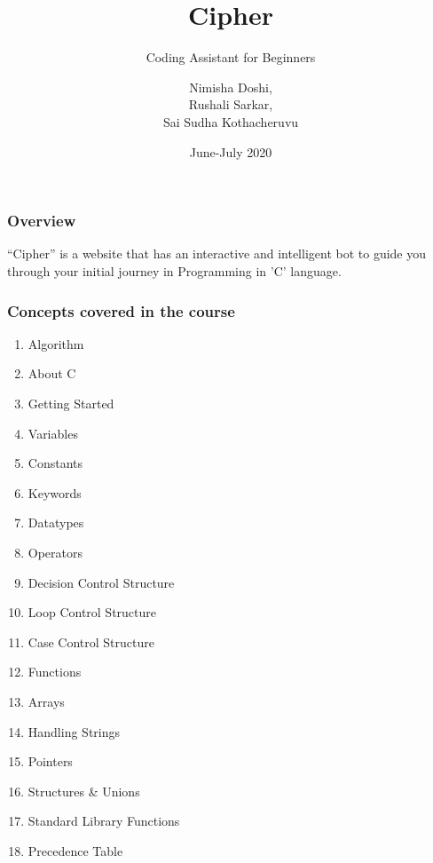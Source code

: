 \documentclass[14pt]{beamer}
\title[Cipher]{Cipher}
\subtitle[Coding Assitant]{Coding Assistant for Beginners}
\author[Team 2]{Nimisha Doshi, \\ Rushali Sarkar, \\ Sai Sudha Kothacheruvu}
\date[June 2020]{June-July 2020}
\begin{document}
\begin{frame}
    \titlepage
\end{frame}

\begin{frame}
    \frametitle{Overview}
    ``Cipher'' is a website that has an interactive and intelligent bot to guide you through your initial journey in Programming in 'C' language.
\end{frame}

\begin{frame}
    \frametitle{Concepts covered in the course}
    \begin{enumerate}
    \item  Algorithm  \\                       
    \item  About C \\
    \item  Getting Started \\            
    \item  Variables    \\
    \item  Constants   \\                     
    \item  Keywords      \\    
    \item  Datatypes \\
    \item  Operators   \\                      
    \item  Decision Control Structure \\
    \item  Loop Control Structure  \\
    \item  Case Control Structure\\
    \item  Functions   \\
    \item  Arrays   \\
    \item  Handling Strings\\                          
    \item  Pointers          \\ 
    \item  Structures & Unions\\
    \item  Standard Library Functions\\
    \item  Precedence Table\\
\end{enumerate}    
\end{frame}
\end{document}
